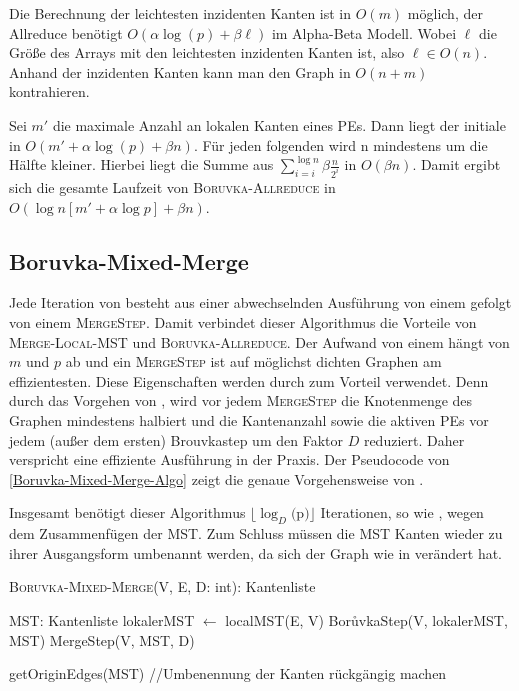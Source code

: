 Die Berechnung der leichtesten inzidenten Kanten ist in $O(m)$ möglich, der Allreduce benötigt $O(\alpha \log(p)+\beta \ell)$ im Alpha-Beta Modell. Wobei $\ell$ die Größe des Arrays mit den leichtesten inzidenten Kanten ist, also $\ell \in O(n)$.
Anhand der inzidenten Kanten kann man den Graph in $O(n + m)$ kontrahieren.


Sei $m'$ die maximale Anzahl an lokalen Kanten eines PEs.
Dann liegt der initiale \boruvkaStep \space in $O(m'+ \alpha \log(p)+\beta n)$.
Für jeden folgenden \boruvkaStep \space wird n mindestens um die Hälfte kleiner. Hierbei liegt die Summe aus $\sum_{i=i}^{\log n} \beta \frac{n}{2^i}$ in $O(\beta n)$.
Damit ergibt sich die gesamte Laufzeit von \textsc{Boruvka-Allreduce} in $O(\log n [m' + \alpha \log p]  +\beta n)$.




\subsection{Boruvka-Mixed-Merge}
Jede Iteration von \boruvkaMixedMerge besteht aus einer abwechselnden Ausführung von einem \boruvkaStep \space gefolgt von einem \textsc{MergeStep}.
Damit verbindet dieser Algorithmus die Vorteile von \textsc{Merge-Local-MST} und \textsc{Boruvka-Allreduce}.
Der Aufwand von einem \boruvkaStep \space hängt von $m$ und $p$ ab und ein \textsc{MergeStep} ist auf möglichst dichten Graphen am effizientesten. Diese Eigenschaften werden durch \boruvkaMixedMerge zum Vorteil verwendet.
Denn durch das Vorgehen von \boruvkaMixedMerge, wird vor jedem \textsc{MergeStep} die Knotenmenge des Graphen mindestens halbiert und die Kantenanzahl sowie die aktiven PEs vor jedem (außer dem ersten) Brouvkastep um den Faktor $D$ reduziert.
Daher verspricht \boruvkaMixedMerge eine effiziente Ausführung in der Praxis.
Der Pseudocode von \cref{Boruvka-Mixed-Merge-Algo} zeigt die genaue Vorgehensweise von \boruvkaMixedMerge.

Insgesamt benötigt dieser Algorithmus $\lfloor \log_{D}($p$) \rfloor $ Iterationen, so wie \mergeMST, wegen dem Zusammenfügen der MST.
Zum Schluss müssen die MST Kanten wieder zu ihrer Ausgangsform umbenannt werden, da sich der Graph wie in \boruvkaAllreduce verändert hat.\\


\begin{algorithm} 
\caption{\textsc{Boruvka-Mixed-Merge}(V, E, D: int): Kantenliste}
\begin{algorithmic}[1]
\label{Boruvka-Mixed-Merge-Algo}

\STATE MST: Kantenliste
\STATE lokalerMST $\gets$ localMST(E, V)
    \STATE Bor{\r u}vkaStep(V, lokalerMST, MST)
    \STATE MergeStep(V, MST, D)
\ENDFOR

\RETURN getOriginEdges(MST) //Umbenennung der Kanten rückgängig machen
\end{algorithmic}
\end{algorithm}

